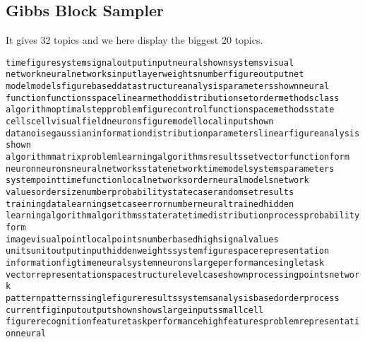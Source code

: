 \documentclass{article}
\begin{document}
\begin{spacing}{1.1}
\subsection{Gibbs Block Sampler}
It gives 32 topics and we here display the biggest 20 topics.  
\begin{alltt}
 time figure system signal output input neural shown systems visual
 network neural networks input layer weights number figure output net
 model models figure based data structure analysis parameters shown neural
 function functions space linear method distribution set order methods class
 algorithm optimal step problem figure control function space methods state
 cells cell visual field neurons figure model local input shown
 data noise gaussian information distribution parameters linear figure analysis shown
 algorithm matrix problem learning algorithms results set vector function form
 neuron neurons neural networks state network time model systems parameters
 system point time function local networks order neural models network
 values order size number probability state case random set results
 training data learning set case error number neural trained hidden
 learning algorithm algorithms state rate time distribution process probability form
 image visual point local points number based high signal values
 units unit output input hidden weights system figure space representation
 information fig time neural system neurons large performance single task
 vector representation space structure level case shown processing points network
 pattern patterns single figure results systems analysis based order process
 current fig input output shown shows large inputs small cell
 figure recognition feature task performance high features problem representation neural
\end{alltt}


\end{spacing}
\end{document}
